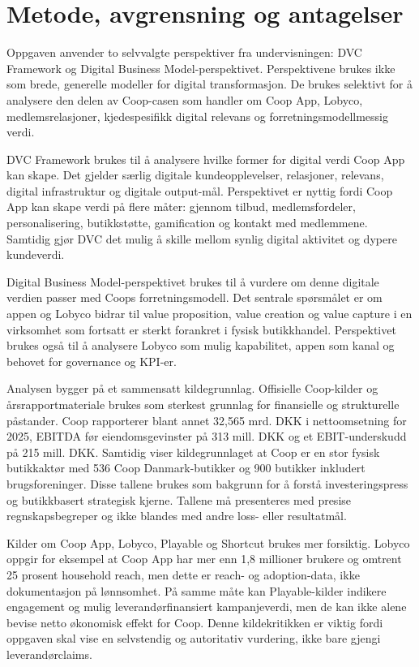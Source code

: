 \documentclass[12pt,a4paper]{article}
\begin{document}
\section{Metode, avgrensning og antagelser}

Oppgaven anvender to selvvalgte perspektiver fra undervisningen: DVC Framework og Digital Business Model-perspektivet. Perspektivene brukes ikke som brede, generelle modeller for digital transformasjon. De brukes selektivt for å analysere den delen av Coop-casen som handler om Coop App, Lobyco, medlemsrelasjoner, kjedespesifikk digital relevans og forretningsmodellmessig verdi.

DVC Framework brukes til å analysere hvilke former for digital verdi Coop App kan skape. Det gjelder særlig digitale kundeopplevelser, relasjoner, relevans, digital infrastruktur og digitale output-mål. Perspektivet er nyttig fordi Coop App kan skape verdi på flere måter: gjennom tilbud, medlemsfordeler, personalisering, butikkstøtte, gamification og kontakt med medlemmene. Samtidig gjør DVC det mulig å skille mellom synlig digital aktivitet og dypere kundeverdi.

Digital Business Model-perspektivet brukes til å vurdere om denne digitale verdien passer med Coops forretningsmodell. Det sentrale spørsmålet er om appen og Lobyco bidrar til value proposition, value creation og value capture i en virksomhet som fortsatt er sterkt forankret i fysisk butikkhandel. Perspektivet brukes også til å analysere Lobyco som mulig kapabilitet, appen som kanal og behovet for governance og KPI-er.

Analysen bygger på et sammensatt kildegrunnlag. Offisielle Coop-kilder og årsrapportmateriale brukes som sterkest grunnlag for finansielle og strukturelle påstander. Coop rapporterer blant annet 32,565 mrd. DKK i nettoomsetning for 2025, EBITDA før eiendomsgevinster på 313 mill. DKK og et EBIT-underskudd på 215 mill. DKK. Samtidig viser kildegrunnlaget at Coop er en stor fysisk butikkaktør med 536 Coop Danmark-butikker og 900 butikker inkludert brugsforeninger. Disse tallene brukes som bakgrunn for å forstå investeringspress og butikkbasert strategisk kjerne. Tallene må presenteres med presise regnskapsbegreper og ikke blandes med andre loss- eller resultatmål.

Kilder om Coop App, Lobyco, Playable og Shortcut brukes mer forsiktig. Lobyco oppgir for eksempel at Coop App har mer enn 1,8 millioner brukere og omtrent 25 prosent household reach, men dette er reach- og adoption-data, ikke dokumentasjon på lønnsomhet. På samme måte kan Playable-kilder indikere engagement og mulig leverandørfinansiert kampanjeverdi, men de kan ikke alene bevise netto økonomisk effekt for Coop. Denne kildekritikken er viktig fordi oppgaven skal vise en selvstendig og autoritativ vurdering, ikke bare gjengi leverandørclaims.
\end{document}
